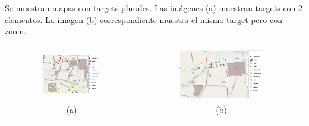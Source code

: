 Se muestran mapas con targets plurales. Las im\'agenes (a) muestran targets con 2 elementos. La imagen (b) correspondiente muestra el mismo target pero con zoom.

\noindent
\begin{center}
\begin{tabular}{c c}
& \\
\includegraphics[width=0.46\textwidth]{images/corpus/mapa8.png} & \includegraphics[width=0.53\textwidth]{images/corpus/mapa18.png} \\
(a) & (b) \\
& \\
\end{tabular}
\end{center}

